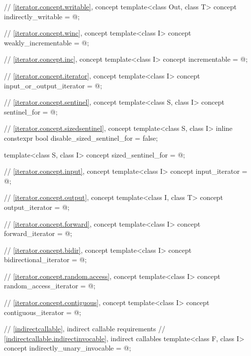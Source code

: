 \begin{codeblock}
{  // \ref{iterator.concept.writable}, concept 
  template<class Out, class T>
    concept indirectly_writable = @\seebelow@;

  // \ref{iterator.concept.winc}, concept 
  template<class I>
    concept weakly_incrementable = @\seebelow@;

  // \ref{iterator.concept.inc}, concept 
  template<class I>
    concept incrementable = @\seebelow@;

  // \ref{iterator.concept.iterator}, concept 
  template<class I>
    concept input_or_output_iterator = @\seebelow@;

  // \ref{iterator.concept.sentinel}, concept 
  template<class S, class I>
    concept sentinel_for = @\seebelow@;

  // \ref{iterator.concept.sizedsentinel}, concept 
  template<class S, class I>
    inline constexpr bool disable_sized_sentinel_for = false;

  template<class S, class I>
    concept sized_sentinel_for = @\seebelow@;

  // \ref{iterator.concept.input}, concept 
  template<class I>
    concept input_iterator = @\seebelow@;

  // \ref{iterator.concept.output}, concept 
  template<class I, class T>
    concept output_iterator = @\seebelow@;

  // \ref{iterator.concept.forward}, concept 
  template<class I>
    concept forward_iterator = @\seebelow@;

  // \ref{iterator.concept.bidir}, concept 
  template<class I>
    concept bidirectional_iterator = @\seebelow@;

  // \ref{iterator.concept.random.access}, concept 
  template<class I>
    concept random_access_iterator = @\seebelow@;

  // \ref{iterator.concept.contiguous}, concept 
  template<class I>
    concept contiguous_iterator = @\seebelow@;

  // \ref{indirectcallable}, indirect callable requirements
  // \ref{indirectcallable.indirectinvocable}, indirect callables
  template<class F, class I>
    concept indirectly_unary_invocable = @\seebelow@;

}
\end{codeblock}
